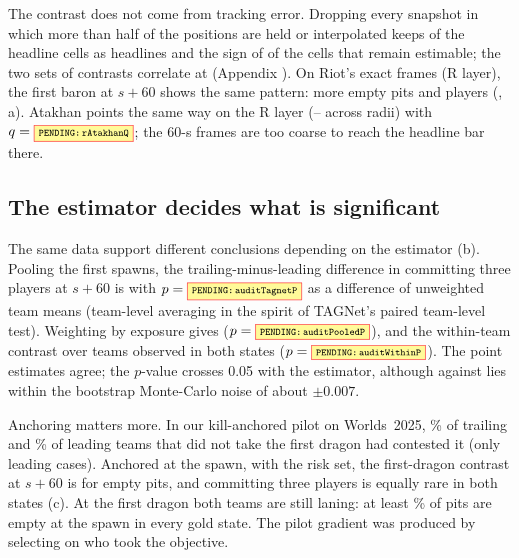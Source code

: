 The contrast does not come from tracking error.
Dropping every snapshot in which more than half of the positions are held or interpolated keeps  of the  headline cells as headlines and the sign of  of the cells that remain estimable; the two sets of contrasts correlate at  (Appendix ).
On Riot's exact frames (R layer), the first baron at $s{+}60$ shows the same pattern: \pp{}  more empty pits and   players (, a).
Atakhan points the same way on the R layer (--\pp{} across radii) with $q=\V{rAtakhanQ}$; the 60-s frames are too coarse to reach the headline bar there.

\subsection{The estimator decides what is significant}
\label{sec:audit}


The same data support different conclusions depending on the estimator (b).
Pooling the first spawns, the trailing-minus-leading difference in committing three players at $s{+}60$ is \pp{}  with $p=\V{auditTagnetP}$ as a difference of unweighted team means (team-level averaging in the spirit of TAGNet's paired team-level test).
Weighting by exposure gives \pp{} ($p=\V{auditPooledP}$), and the within-team contrast over teams observed in both states \pp{} ($p=\V{auditWithinP}$).
The point estimates agree; the $p$-value crosses 0.05 with the estimator, although  against  lies within the bootstrap Monte-Carlo noise of about $\pm0.007$.

Anchoring matters more.
In our kill-anchored pilot on Worlds~2025, \% of trailing and \% of leading teams that did not take the first dragon had contested it (only  leading cases).
Anchored at the spawn, with the risk set, the first-dragon contrast at $s{+}60$ is \pp{}  for empty pits, and committing three players is equally rare in both states (c).
At the first dragon both teams are still laning: at least \% of pits are empty at the spawn in every gold state.
The pilot gradient was produced by selecting on who took the objective.

